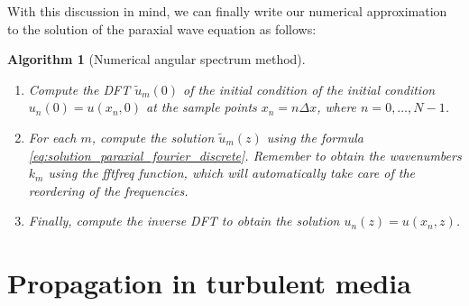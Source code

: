 \documentclass[openany,a4paper,oneside,11pt]{article}
\newtheorem{alg}{Algorithm}
\begin{document}
With this discussion in mind, we can finally write our numerical approximation to the solution of the paraxial wave equation as follows:
\begin{alg}[Numerical angular spectrum method]
\leavevmode
\begin{enumerate}
    \item Compute the DFT $\tilde{u}_m(0)$ of the initial condition of the initial condition $u_n(0) = u(x_n,0)$ at the sample points $x_n = n \Delta x$, where $n = 0, \ldots, N-1$.
    \item For each $m$, compute the solution $\tilde{u}_m(z)$ using the formula \eqref{eq:solution_paraxial_fourier_discrete}. Remember to obtain the wavenumbers $k_m$ using the fftfreq function, which will automatically take care of the reordering of the frequencies.
    \item Finally, compute the inverse DFT to obtain the solution $u_n(z) = u(x_n,z)$.
\end{enumerate}
\end{alg}

\section{Propagation in turbulent media}

 

\end{document}
